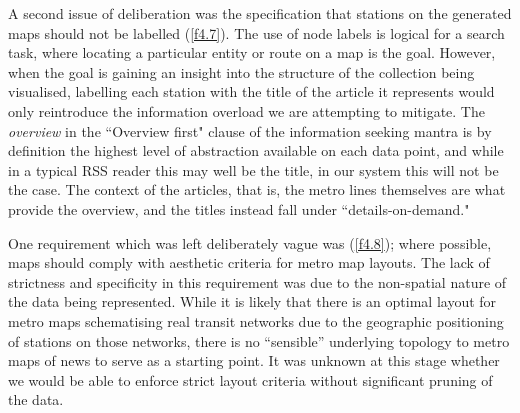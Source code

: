 A second issue of deliberation was the specification that stations on the generated maps should not be labelled (\ref{f4.7}). The use of node labels is logical for a search task, where locating a particular entity or route on a map is the goal. However, when the goal is gaining an insight into the structure of the collection being visualised, labelling each station with the title of the article it represents would only reintroduce the information overload we are attempting to mitigate. The \textit{overview} in the ``Overview first" clause of the information seeking mantra \citep{TheEyesHaveIt} is by definition the highest level of abstraction available on each data point, and while in a typical RSS reader this may well be the title, in our system this will not be the case. The context of the articles, that is, the metro lines themselves are what provide the overview, and the titles instead fall under ``details-on-demand."

One requirement which was left deliberately vague was (\ref{f4.8}); where possible, maps should comply with  aesthetic criteria for metro map layouts. The lack of strictness and specificity in this requirement was due to the non-spatial nature of the data being represented. While it is likely that there is an optimal layout for metro maps schematising real transit networks due to the geographic positioning of stations on those networks, there is no ``sensible'' underlying topology to metro maps of news to serve as a starting point. It was unknown at this stage whether we would be able to enforce strict layout criteria without significant pruning of the data.



